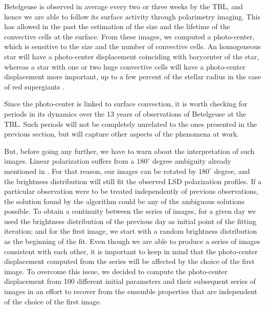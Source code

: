 \documentclass{aa}
\begin{document}
Betelgeuse is observed in average every two or three weeks by the TBL, and hence
we are able to follow its surface activity through polarimetry imaging. This has  allowed in the past the estimation of  the size and the
 lifetime of the convective cells
at the surface. From these images, we computed a photo-center, which is sensitive to the size and the number of convective cells. 
An homogeneous star will have a photo-center displacement coinciding with barycenter of the star, whereas a star with one or two huge convective cells will have a
photo-center displacement more important, up to a few percent of the stellar radius in the case of red supergiants \citep{chiavassa_probing_2022}. 

Since the photo-center is linked to surface convection, it is worth checking for periods in its 
dynamics over the 13 years of observations of Betelgeuse at the TBL. Such periods will not 
be completely unrelated to the ones presented in the previous section, but will capture 
other aspects of the phenomena at work.

But, before going any further, we have to warn
 about the interpretation of such images. 
Linear polarization suffers from a $180 ^\circ$ degree ambiguity already mentioned in \cite{auriere_discovery_2016}. For that reason, our images 
can be 
rotated by $180^\circ$ degree, and the brightness distribution will still fit the observed LSD polarization profiles. 
If a particular observation were to be treated independently of previous observations, the solution found by 
the algorithm could be any of the ambiguous solutions possible. To obtain a continuity 
between the series of images, 
for a given day we used the brightness distribution of the previous day as initial point 
of the  fitting iteration; and for the first image, we start with a 
random brightness distribution as the beginning of the fit. 
Even though we are able to produce a series of images  consistent with each other, it is important 
to keep in mind that the photo-center displacement computed from the series 
will be affected by the choice of the first image. 
To overcome this issue, we decided to compute
the photo-center displacement from 100 different initial parameters and their subsequent series 
of images in an effort to recover from the ensemble
properties that are independent of the choice of the first image. 
\end{document}
